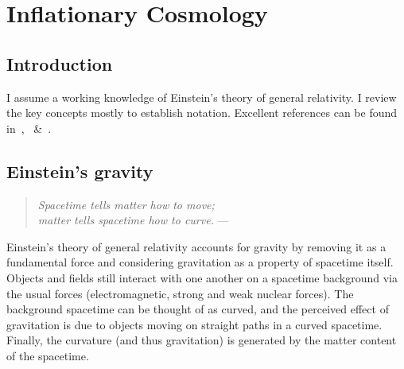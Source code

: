 \chapter{Inflationary Cosmology}
\label{chap:cos}

\section{Introduction}
\label{sec:cos:intro}

I assume a working knowledge of Einstein's theory of general relativity. I review the key concepts mostly to establish notation. Excellent references can be found in~\cite{Wald},~\cite{Hobson} \&~\cite{Dodelson}.

\section{Einstein's gravity}
\label{sec:cos:einsteins_gravity}
\begin{quote}
  {\em Spacetime tells matter how to move;\\ matter tells spacetime how to curve.}\hfill
  --- \johnwheeler{}
\end{quote}

Einstein's theory of general relativity accounts for gravity by removing it as a fundamental force and considering gravitation as a property of spacetime itself. Objects and fields still interact with one another on a spacetime background via the usual forces (electromagnetic, strong and weak nuclear forces). The background spacetime can be thought of as curved, and the perceived effect of gravitation is due to objects moving on straight paths in a curved spacetime. Finally, the curvature (and thus gravitation) is generated by the matter content of the spacetime.


